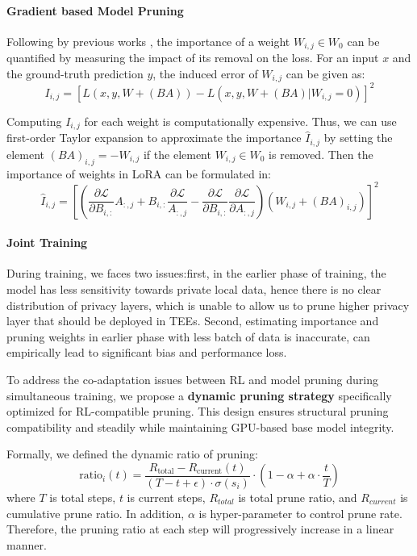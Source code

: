 \documentclass{article}
\begin{document}
\paragraph{Gradient based Model Pruning}
Following by previous works \cite{zhang2023loraprune,ma2023llm_prune,molchanov2019pruning}, the importance of a weight $W_{i,j} \in W_{0}$ can be quantified by measuring the impact of its removal on the loss. For an input $x$ and the ground-truth prediction $y$, the induced error of $W_{i,j}$ can be given as:
\begin{equation}
    I_{i,j} = \left[ L(x,y,W+(BA)) - L(x,y,W+(BA) | W_{i,j} = 0) \right]^2
\end{equation}

Computing $I_{i,j}$ for each weight is computationally expensive. Thus, we can use first-order Taylor expansion to approximate the importance $\hat{I}_{i,j}$ by setting the element $(BA)_{i,j} = -W_{i,j}$ if the element $W_{i,j} \in W_0$ is removed. Then the importance of weights in LoRA can be formulated in:
\begin{equation}
       \hat{I}_{i,j} = [(\frac{\partial\mathcal{L}}{\partial B_{i,:}}A_{:,j}+B_{i,:}\frac{\partial\mathcal{L}}{A_{:,j}}-\frac{\partial\mathcal{L}}{\partial B_{i,:}}\frac{\partial\mathcal{L}}{\partial A_{:,j}})(W_{i,j}+(BA)_{i,j})]^2
\end{equation}

\paragraph{Joint Training}
During training, we faces two issues:first, in the earlier phase of training, the model has less sensitivity towards private local data, hence there is no clear distribution of privacy layers, which is unable to allow us to prune higher privacy layer that should be deployed in TEEs. Second, estimating importance and pruning weights in earlier phase with less batch of data is inaccurate, can empirically lead to significant bias and performance loss.

To address the co-adaptation issues between RL and model pruning during simultaneous training, we propose a \textbf{dynamic pruning strategy} specifically optimized for RL-compatible pruning. This design ensures structural pruning compatibility and steadily while maintaining GPU-based base model integrity.

Formally, we defined the dynamic ratio of pruning:
\begin{equation}
    \text{ratio}_i(t) = \frac{R_{\text{total}} - R_{\text{current}}(t)}{(T - t + \epsilon) \cdot \sigma(s_i)} \cdot \left(1 -\alpha + \alpha \cdot \frac{t}{T}\right)
\end{equation}
where $T$ is total steps, $t$ is current steps, $R_{total}$ is total prune ratio, and $R_{current}$ is cumulative prune ratio. In addition, $\alpha$ is hyper-parameter to control prune rate. Therefore, the pruning ratio at each step will progressively increase in a linear manner.
\end{document}
